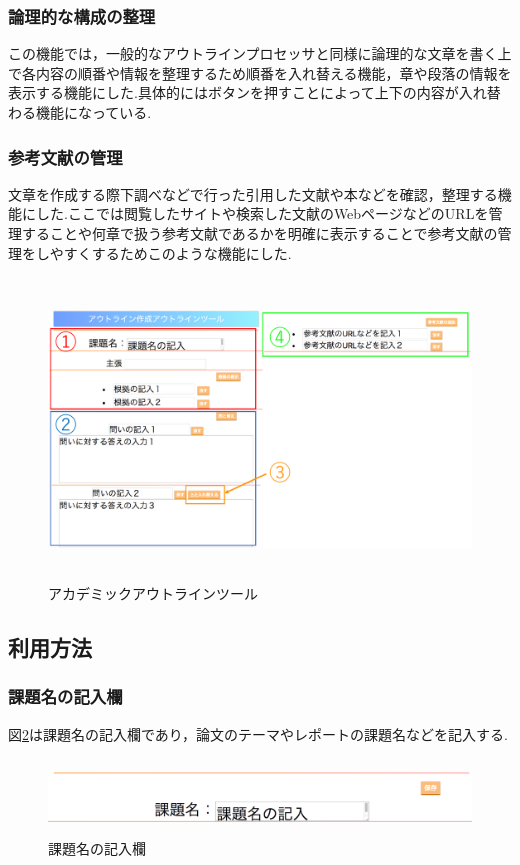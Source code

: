 \documentclass[a4j,12pt]{jarticle}
\begin{document}
\subsubsection{論理的な構成の整理}
この機能では，一般的なアウトラインプロセッサと同様に論理的な文章を書く上で各内容の順番や情報を整理するため順番を入れ替える機能，章や段落の情報を表示する機能にした.具体的にはボタンを押すことによって上下の内容が入れ替わる機能になっている.

\subsubsection{参考文献の管理}
文章を作成する際下調べなどで行った引用した文献や本などを確認，整理する機能にした.ここでは閲覧したサイトや検索した文献のWebページなどのURLを管理することや何章で扱う参考文献であるかを明確に表示することで参考文献の管理をしやすくするためこのような機能にした.
\newpage
\begin{figure}[h]
\begin{center}
 \includegraphics[clip,width=130mm,height=80mm]{figure/pp01.pdf}
\end{center}
 \caption{アカデミックアウトラインツール}
 \label{fig:g}
\end{figure}
\newpage
\subsection{利用方法}
\subsubsection{課題名の記入欄}
図\ref{fig:h}は課題名の記入欄であり，論文のテーマやレポートの課題名などを記入する.
\begin{figure}[h]
\begin{center}
 \includegraphics[clip,width=150mm,height=20mm]{figure/00kadai.png}
\end{center}
 \caption{課題名の記入欄}
 \label{fig:h}
\end{figure}
\end{document}
